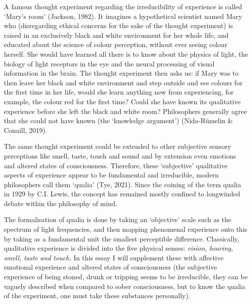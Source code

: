 A famous thought experiment regarding the irreducibility of experience is called ‘Mary’s room’ (Jackson, 1982). It imagines a hypothetical scientist named Mary who (disregarding ethical concerns for the sake of the thought experiment) is raised in an exclusively black and white environment for her whole life, and educated about the science of colour perception, without ever seeing colour herself. She would have learned all there is to know about the physics of light, the biology of light receptors in the eye and the neural processing of visual information in the brain. The thought experiment then asks us: if Mary was to then leave her black and white environment and step outside and see colours for the first time in her life, would she learn anything new from experiencing, for example, the colour red for the first time? Could she have known its qualitative experience before she left the black and white room? Philosophers generally agree that she could not have known (the ‘knowledge argument’) (Nida-Rümelin \& Conaill, 2019). 

The same thought experiment could be extended to other subjective sensory perceptions like smell, taste, touch and sound and by extension even emotions and altered states of consciousness. Therefore, these ‘subjective’ qualitative aspects of experience appear to be fundamental and irreducible, modern philosophers call them ‘qualia’ (Tye, 2021). Since the coining of the term qualia in 1929 by C.I. Lewis, the concept has remained mostly confined to longwinded debate within the philosophy of mind.  

The formalisation of qualia is done by taking an ‘objective’ scale such as the spectrum of light frequencies, and then mapping phenomenal experience onto this by taking as a fundamental unit the smallest perceptible difference. Classically, qualitative experience is divided into the five physical senses: \textit{vision, hearing, smell, taste and touch.} In this essay I will supplement these with affective emotional experience and altered states of consciousness (the subjective experience of being stoned, drunk or tripping seems to be irreducible, they can be vaguely described when compared to sober consciousness, but to know the qualia of the experiment, one must take these substances personally). 

